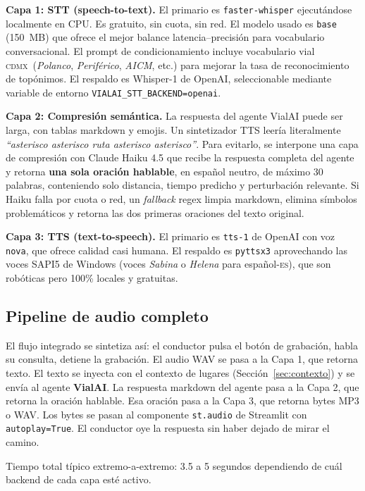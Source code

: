 \documentclass[11pt,a4paper]{article}
\newcommand{\VialAI}{\textbf{\textcolor{vialTeal}{Vial}\textcolor{vialAmber}{AI}}}
\newcommand{\CDMX}{\textsc{cdmx}}
\begin{document}
\textbf{Capa 1: STT (speech-to-text).} El primario es
\texttt{faster-whisper} ejecutándose localmente en CPU. Es
gratuito, sin cuota, sin red. El modelo usado es \texttt{base}
(\SI{150}{MB}) que ofrece el mejor balance
latencia--precisión para vocabulario conversacional. El prompt
de condicionamiento incluye vocabulario vial \CDMX\
(\emph{Polanco}, \emph{Periférico}, \emph{AICM}, etc.) para
mejorar la tasa de reconocimiento de topónimos. El respaldo es
Whisper-1 de OpenAI, seleccionable mediante variable de entorno
\texttt{VIALAI\_STT\_BACKEND=openai}.

\textbf{Capa 2: Compresión semántica.} La respuesta del agente
VialAI puede ser larga, con tablas markdown y emojis. Un
sintetizador TTS leería literalmente \emph{``asterisco asterisco
ruta asterisco asterisco''}. Para evitarlo, se interpone una
capa de compresión con Claude Haiku 4.5 que recibe la respuesta
completa del agente y retorna \textbf{una sola oración
hablable}, en español neutro, de máximo \num{30} palabras,
conteniendo solo distancia, tiempo predicho y perturbación
relevante. Si Haiku falla por cuota o red, un \emph{fallback}
regex limpia markdown, elimina símbolos problemáticos y retorna
las dos primeras oraciones del texto original.

\textbf{Capa 3: TTS (text-to-speech).} El primario es
\texttt{tts-1} de OpenAI con voz \texttt{nova}, que ofrece
calidad casi humana. El respaldo es \texttt{pyttsx3}
aprovechando las voces SAPI5 de Windows (voces \emph{Sabina} o
\emph{Helena} para español-\textsc{es}), que son robóticas pero
100\% locales y gratuitas.

\subsection{Pipeline de audio completo}

El flujo integrado se sintetiza así: el conductor pulsa el botón
de grabación, habla su consulta, detiene la grabación. El audio
WAV se pasa a la Capa 1, que retorna texto. El texto se inyecta
con el contexto de lugares (Sección~\ref{sec:contexto}) y se
envía al agente \VialAI. La respuesta markdown del agente pasa a
la Capa 2, que retorna la oración hablable. Esa oración pasa a
la Capa 3, que retorna bytes MP3 o WAV. Los bytes se pasan al
componente \texttt{st.audio} de Streamlit con
\texttt{autoplay=True}. El conductor oye la respuesta sin haber
dejado de mirar el camino.

Tiempo total típico extremo-a-extremo: \num{3.5} a \num{5}
segundos dependiendo de cuál backend de cada capa esté activo.
\end{document}
